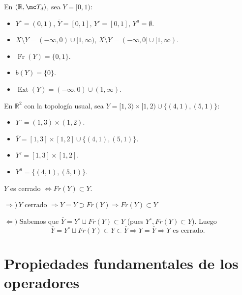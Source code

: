 \begin{ejem}
En $(\mathbb{R}, \mc T_d)$, sea $Y = [0, 1)$:
\begin{itemize}
    \item $Y^\circ = (0, 1)$, $\overline{Y} = [0, 1]$, $Y' = [0, 1]$, $Y^a = \emptyset$.
    \item $X \setminus Y = (-\infty, 0) \cup [1, \infty)$, $\overline{X \setminus Y} = (-\infty, 0] \cup [1, \infty)$.
    \item $\operatorname{Fr}(Y) = \{0, 1\}$.
    \item $b(Y) = \{0\}$.
    \item $\operatorname{Ext}(Y) = (-\infty, 0) \cup (1, \infty)$.
\end{itemize}
\end{ejem}

\begin{ejem}
En $\mathbb{R}^2$ con la topología usual, sea $Y = [1, 3) \times [1, 2) \cup \{(4, 1), (5, 1)\}$:
\begin{itemize}
    \item $Y^\circ = (1, 3) \times (1, 2)$.
    \item $\overline{Y} = [1, 3] \times [1, 2] \cup \{(4, 1), (5, 1)\}$.
    \item $Y' = [1, 3] \times [1, 2]$.
    \item $Y^a = \{(4, 1), (5, 1)\}$.
\end{itemize}
\end{ejem}
\begin{prop}
    $Y$ es cerrado $\iff Fr(Y) \subset Y$.
\end{prop}
\begin{dem}
    $\Rightarrow) \, Y$ cerrado $\Rightarrow Y = \bar Y \supset Fr(Y) \Rightarrow Fr(Y) \subset Y$

    $\Leftarrow)$ Sabemos que $\bar Y = Y^{\circ} \sqcup Fr(Y)\subset Y$ (pues $Y^{\circ}, Fr(Y)\subset Y$). Luego
    $$\overline{Y} = Y^{\circ} \sqcup Fr(Y) \subset Y \subset \overline{Y} \Rightarrow Y = \overline{Y} \Rightarrow Y \text{ es cerrado.}$$
\end{dem}

\section{Propiedades fundamentales de los operadores}

